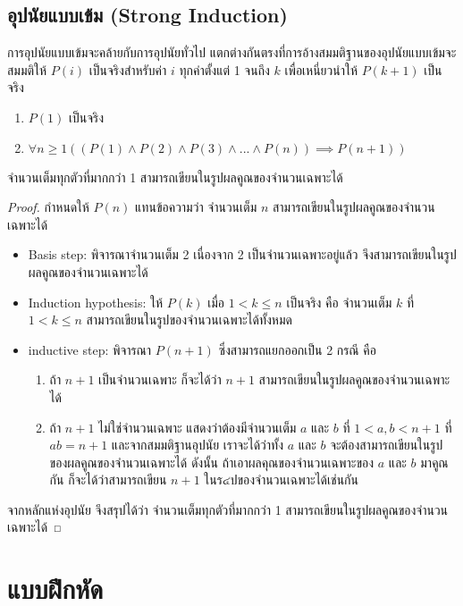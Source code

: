 \subsection{อุปนัยแบบเข้ม (Strong Induction)}

การอุปนัยแบบเข้มจะคล้ายกับการอุปนัยทั่วไป แตกต่างกันตรงที่การอ้างสมมติฐานของอุปนัยแบบเข้มจะสมมติให้ $P(i)$ เป็นจริงสำหรับค่า $i$ ทุกค่าตั้งแต่ 1 จนถึง $k$ เพื่อเหนี่ยวนำให้ $P(k+1)$ เป็นจริง
\begin{enumerate}
\item $P(1)$ เป็นจริง
\item $\forall n \geq 1 ((P(1) \wedge P(2) \wedge P(3) \wedge ... \wedge P(n)) \implies P(n+1))$
\end{enumerate}

\begin{theorem}
จำนวนเต็มทุกตัวที่มากกว่า 1 สามารถเขียนในรูปผลคูณของจำนวนเฉพาะได้
\end{theorem}
\begin{proof}
กำหนดให้ $P(n)$ แทนข้อความว่า จำนวนเต็ม $n$ สามารถเขียนในรูปผลคูณของจำนวนเฉพาะได้
\begin{itemize}
\item Basis step: พิจารณาจำนวนเต็ม 2 เนื่องจาก 2 เป็นจำนวนเฉพาะอยู่แล้ว จึงสามารถเขียนในรูปผลคูณของจำนวนเฉพาะได้
\item Induction hypothesis: ให้ $P(k)$ เมื่อ $1 < k \leq n$ เป็นจริง คือ จำนวนเต็ม $k$ ที่ $1 < k \leq n$ สามารถเขียนในรูปของจำนวนเฉพาะได้ทั้งหมด
\item inductive step: พิจารณา $P(n+1)$ ซึ่งสามารถแยกออกเป็น 2 กรณี คือ
\begin{enumerate}
\item ถ้า $n+1$ เป็นจำนวนเฉพาะ ก็จะได้ว่า $n+1$ สามารถเขียนในรูปผลคูณของจำนวนเฉพาะได้
\item ถ้า $n+1$ ไม่ใช่จำนวนเฉพาะ แสดงว่าต้องมีจำนวนเต็ม $a$ และ $b$ ที่ $1 < a,b < n+1$ ที่ $ab=n+1$ และจากสมมติฐานอุปนัย เราจะได้ว่าทั้ง $a$ และ $b$ จะต้องสามารถเขียนในรูปของผลคูณของจำนวนเฉพาะได้ ดังนั้น ถ้าเอาผลคุณของจำนวนเฉพาะของ $a$ และ $b$ มาคูณกัน ก็จะได้ว่าสามารถเขียน $n+1$ ในร๔ปของจำนวนเฉพาะได้เช่นกัน
\end{enumerate}
\end{itemize}
จากหลักแห่งอุปนัย จึงสรุปได้ว่า จำนวนเต็มทุกตัวที่มากกว่า 1 สามารถเขียนในรูปผลคูณของจำนวนเฉพาะได้
\end{proof}
\section*{แบบฝึกหัด}
